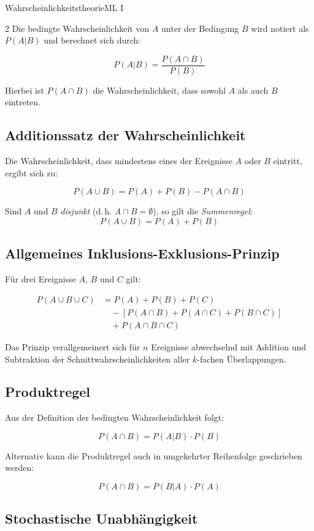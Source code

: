 \begin{formulaBox}{Wahrscheinlichkeitstheorie}{ML I}
\begin{multicols}{2}
Die bedingte Wahrscheinlichkeit von $A$ unter der Bedingung $B$ wird notiert als $P(A | B)$ und berechnet sich durch:

\[
P(A | B) = \frac{P(A \cap B)}{P(B)}
\]

Hierbei ist $P(A \cap B)$ die Wahrscheinlichkeit, dass sowohl $A$ als auch $B$ eintreten.

\subsection*{Additionssatz der Wahrscheinlichkeit}

Die Wahrscheinlichkeit, dass mindestens eines der Ereignisse $A$ oder $B$ eintritt, ergibt sich zu:

\[
P(A \cup B) = P(A) + P(B) - P(A \cap B)
\]

Sind $A$ und $B$ \emph{disjunkt} (d.\,h. $A \cap B = \emptyset$), so gilt die \emph{Summenregel}:
\[
P(A \cup B) = P(A) + P(B)
\]

\subsection*{Allgemeines Inklusions-Exklusions-Prinzip}

Für drei Ereignisse $A$, $B$ und $C$ gilt:

\[
\begin{aligned}
P(A \cup B \cup C)
&= P(A) + P(B) + P(C) \\
&\quad - [P(A \cap B) + P(A \cap C) + P(B \cap C)] \\
&\quad + P(A \cap B \cap C)
\end{aligned}
\]

Das Prinzip verallgemeinert sich für $n$ Ereignisse abwechselnd mit Addition und Subtraktion der Schnittwahrscheinlichkeiten aller $k$-fachen Überlappungen.

\subsection*{Produktregel}

Aus der Definition der bedingten Wahrscheinlichkeit folgt:

\[
P(A \cap B) = P(A | B) \cdot P(B)
\]

Alternativ kann die Produktregel auch in umgekehrter Reihenfolge geschrieben werden:

\[
P(A \cap B) = P(B | A) \cdot P(A)
\]

\subsection*{Stochastische Unabhängigkeit}


\end{multicols}
\end{formulaBox}
